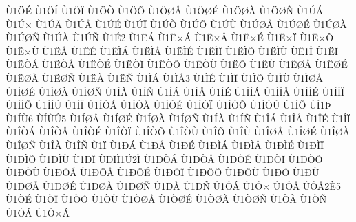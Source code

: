 {^^d91^^d6^^c9
^^d91^^d6^^cd
^^d91^^d6^^cf
^^d91^^d6^^d2
^^d91^^d6^^d5
^^d91^^d6^^d8^^c5
^^d91^^d6^^d8^^c9
^^d91^^d6^^d8^^c0
^^d91^^d6^^d8^^d1
^^d91^^da^^c1
^^d91^^da^^d7
^^d91^^da^^c4
^^d91^^da^^c5
^^d91^^da^^c9
^^d91^^da^^cf
^^d91^^da^^d2
^^d91^^da^^d5
^^d91^^da^^d9
^^d91^^da^^d8^^c5
^^d91^^da^^d8^^c9
^^d91^^da^^d8^^c0
^^d91^^da^^d8^^d1
^^d91^^da^^c0
^^d91^^da^^d1
^^d91^^c92
^^d91^^cb^^c1
^^d91^^cb^^d7^^c1
^^d91^^cb^^d7^^c5
^^d91^^cb^^d7^^c9
^^d91^^cb^^d7^^cf
^^d91^^cb^^d7^^d5
^^d91^^cb^^d7^^d9
^^d91^^cb^^c5
^^d91^^cb^^c9
^^d91^^cb^^cc^^c1
^^d91^^cb^^cc^^c5
^^d91^^cb^^cc^^c9
^^d91^^cb^^cc^^cf
^^d91^^cb^^cc^^d5
^^d91^^cb^^cc^^d9
^^d9^^cb1^^ce
^^d91^^cb^^cf
^^d91^^cb^^d2^^c1
^^d91^^cb^^d2^^c5
^^d91^^cb^^d2^^c9
^^d91^^cb^^d2^^cf
^^d91^^cb^^d2^^d5
^^d91^^cb^^d2^^d9
^^d91^^cb^^d5
^^d91^^cb^^d9
^^d91^^cb^^d8^^c5
^^d91^^cb^^d8^^c9
^^d91^^cb^^d8^^c0
^^d91^^cb^^d8^^d1
^^d91^^cb^^c0
^^d91^^cb^^d1
^^d91^^cc^^c1
^^d91^^cc^^c53
^^d91^^cc^^c9
^^d91^^cc^^cf
^^d91^^cc^^d5
^^d91^^cc^^d9
^^d91^^cc^^d8^^c5
^^d91^^cc^^d8^^c9
^^d91^^cc^^d8^^c0
^^d91^^cc^^d8^^d1
^^d91^^cc^^c0
^^d91^^cc^^d1
^^d91^^cd^^c1
^^d91^^cd^^c5
^^d91^^cd^^c9
^^d91^^cd^^cc^^c1
^^d91^^cd^^cc^^c5
^^d91^^cd^^cc^^c9
^^d91^^cd^^cc^^cf
^^d91^^cd^^cc^^d5
^^d91^^cd^^cc^^d9
^^d91^^cd^^cf
^^d91^^cd^^d2^^c1
^^d91^^cd^^d2^^c5
^^d91^^cd^^d2^^c9
^^d91^^cd^^d2^^cf
^^d91^^cd^^d2^^d5
^^d91^^cd^^d2^^d9
^^d91^^cd^^d5
^^d9^^cd1^^de
^^d91^^cd^^d96
^^d9^^cd^^d9^^db5
^^d91^^cd^^d8^^c5
^^d91^^cd^^d8^^c9
^^d91^^cd^^d8^^c0
^^d91^^cd^^d8^^d1
^^d91^^cd^^c0
^^d91^^cd^^d1
^^d91^^ce^^c1
^^d91^^ce^^c5
^^d91^^ce^^c9
^^d91^^ce^^cf
^^d91^^ce^^d2^^c1
^^d91^^ce^^d2^^c5
^^d91^^ce^^d2^^c9
^^d91^^ce^^d2^^cf
^^d91^^ce^^d2^^d5
^^d91^^ce^^d2^^d9
^^d91^^ce^^d5
^^d91^^ce^^d9
^^d91^^ce^^d8^^c5
^^d91^^ce^^d8^^c9
^^d91^^ce^^d8^^c0
^^d91^^ce^^d8^^d1
^^d91^^ce^^c0
^^d91^^ce^^d1
^^d91^^cf
^^d91^^d0^^c1
^^d91^^d0^^c5
^^d91^^d0^^c9
^^d91^^d0^^cc^^c1
^^d91^^d0^^cc^^c5
^^d91^^d0^^cc^^c9
^^d91^^d0^^cc^^cf
^^d91^^d0^^cc^^d5
^^d91^^d0^^cc^^d9
^^d91^^d0^^cf
^^d9^^d0^^cf^^cc1^^da2^^cc
^^d91^^d0^^d2^^c1
^^d91^^d0^^d2^^c5
^^d91^^d0^^d2^^c9
^^d91^^d0^^d2^^cf
^^d91^^d0^^d2^^d5
^^d91^^d0^^d2^^d9
^^d91^^d0^^d4^^c1
^^d91^^d0^^d4^^c5
^^d91^^d0^^d4^^c9
^^d91^^d0^^d4^^cf
^^d91^^d0^^d4^^d5
^^d91^^d0^^d4^^d9
^^d91^^d0^^d5
^^d91^^d0^^d9
^^d91^^d0^^d8^^c5
^^d91^^d0^^d8^^c9
^^d91^^d0^^d8^^c0
^^d91^^d0^^d8^^d1
^^d91^^d0^^c0
^^d91^^d0^^d1
^^d91^^d2^^c1
^^d91^^d2^^d7
^^d91^^d2^^c5
^^d9^^d2^^c52^^c85
^^d91^^d2^^c9
^^d91^^d2^^cf
^^d91^^d2^^d5
^^d91^^d2^^d9
^^d91^^d2^^d8^^c5
^^d91^^d2^^d8^^c9
^^d91^^d2^^d8^^c0
^^d91^^d2^^d8^^d1
^^d91^^d2^^c0
^^d91^^d2^^d1
^^d91^^d3^^c1
^^d91^^d3^^d7^^c1
}
